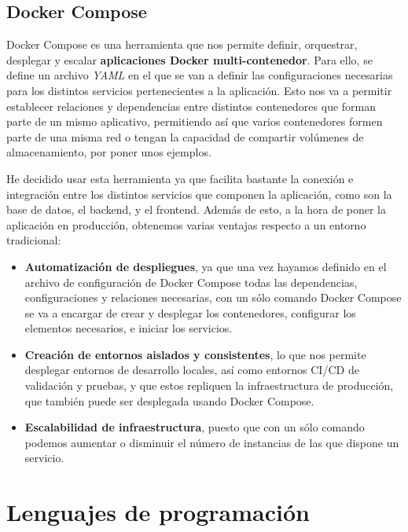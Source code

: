 \subsection{Docker Compose}

Docker Compose es una herramienta que nos permite definir, orquestrar, desplegar y escalar \textbf{aplicaciones Docker multi-contenedor}. \cite{docker-compose:overview} Para ello, se define un archivo \textit{YAML} en el que se van a definir las  configuraciones necesarias para los distintos servicios pertenecientes a la aplicación. Esto nos va a permitir establecer relaciones y dependencias entre distintos contenedores que forman parte de un mismo aplicativo, permitiendo así que varios contenedores formen parte de una misma red o tengan la capacidad de compartir volúmenes de almacenamiento, por poner unos ejemplos.

He decidido usar esta herramienta ya que facilita bastante la conexión e integración entre los distintos servicios que componen la aplicación, como son la base de datos, el backend, y el frontend. Además de esto, a la hora de poner la aplicación en producción, obtenemos varias ventajas respecto a un entorno tradicional:

\begin{itemize}

\item \textbf{Automatización de despliegues}, ya que una vez hayamos definido en el archivo de configuración de Docker Compose todas las dependencias, configuraciones y relaciones necesarias, con un sólo comando Docker Compose se va a encargar de crear y desplegar los contenedores, configurar los elementos necesarios, e iniciar los servicios.
\item \textbf{Creación de entornos aislados y consistentes}, lo que nos permite desplegar entornos de desarrollo locales, así como entornos CI/CD de validación y pruebas, y que estos repliquen la infraestructura de producción, que también puede ser desplegada usando Docker Compose.
\item \textbf{Escalabilidad de infraestructura}, puesto que con un sólo comando podemos aumentar o disminuir el número de instancias de las que dispone un servicio.	
\end{itemize}


\section{Lenguajes de programación}

